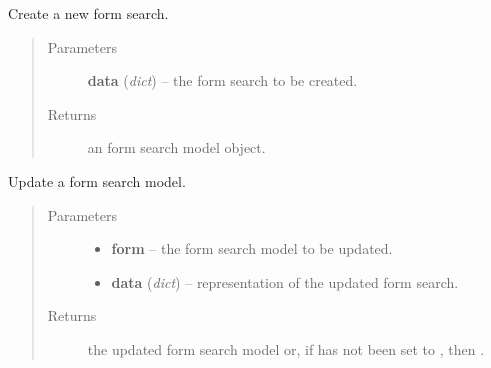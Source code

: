 \documentclass[letterpaper,10pt,english]{sphinxmanual}
\begin{document}

\begin{fulllineitems}
\label{api:onlinelinguisticdatabase.controllers.formsearches.createNewFormSearch}
Create a new form search.
\begin{quote}\begin{description}
\item[{Parameters}] \leavevmode
\textbf{data} (\emph{dict}) -- the form search to be created.

\item[{Returns}] \leavevmode
an form search model object.

\end{description}\end{quote}

\end{fulllineitems}


\begin{fulllineitems}
\label{api:onlinelinguisticdatabase.controllers.formsearches.updateFormSearch}
Update a form search model.
\begin{quote}\begin{description}
\item[{Parameters}] \leavevmode\begin{itemize}
\item {} 
\textbf{form} -- the form search model to be updated.

\item {} 
\textbf{data} (\emph{dict}) -- representation of the updated form search.

\end{itemize}

\item[{Returns}] \leavevmode
the updated form search model or, if  has not been set
to , then .

\end{description}\end{quote}

\end{fulllineitems}
\end{document}
